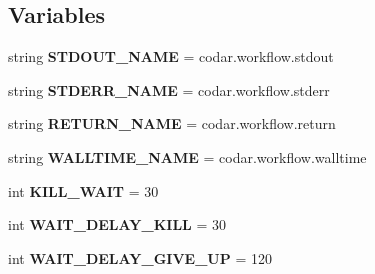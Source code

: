 \subsection*{Variables}
\begin{DoxyCompactItemize}
\item 
\mbox{\label{namespacecodar_1_1savanna_1_1model_a0d566ad370f638d17d805dce32b4bbce}} 
string {\bfseries S\+T\+D\+O\+U\+T\+\_\+\+N\+A\+ME} = \textquotesingle{}codar.\+workflow.\+stdout\textquotesingle{}
\item 
\mbox{\label{namespacecodar_1_1savanna_1_1model_a979eae72abc6932f745c4d4c300f06e7}} 
string {\bfseries S\+T\+D\+E\+R\+R\+\_\+\+N\+A\+ME} = \textquotesingle{}codar.\+workflow.\+stderr\textquotesingle{}
\item 
\mbox{\label{namespacecodar_1_1savanna_1_1model_a375dfbe6e7e59d827254d61f41c881f7}} 
string {\bfseries R\+E\+T\+U\+R\+N\+\_\+\+N\+A\+ME} = \textquotesingle{}codar.\+workflow.\+return\textquotesingle{}
\item 
\mbox{\label{namespacecodar_1_1savanna_1_1model_a24dd8e3ab8d3d0fd004bcd54ce016fbc}} 
string {\bfseries W\+A\+L\+L\+T\+I\+M\+E\+\_\+\+N\+A\+ME} = \textquotesingle{}codar.\+workflow.\+walltime\textquotesingle{}
\item 
\mbox{\label{namespacecodar_1_1savanna_1_1model_a5c2add528fd0ef347e5ff8deb12e9ada}} 
int {\bfseries K\+I\+L\+L\+\_\+\+W\+A\+IT} = 30
\item 
\mbox{\label{namespacecodar_1_1savanna_1_1model_acf527a4d78021abd552f51e81830a7d4}} 
int {\bfseries W\+A\+I\+T\+\_\+\+D\+E\+L\+A\+Y\+\_\+\+K\+I\+LL} = 30
\item 
\mbox{\label{namespacecodar_1_1savanna_1_1model_a131cd01c29206f90bc9505d9b50f1ff6}} 
int {\bfseries W\+A\+I\+T\+\_\+\+D\+E\+L\+A\+Y\+\_\+\+G\+I\+V\+E\+\_\+\+UP} = 120
\end{DoxyCompactItemize}



